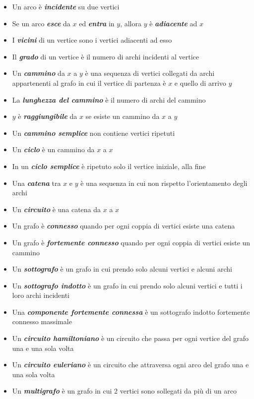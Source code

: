 \begin{itemize}
    \item Un arco è \textbf{\emph{incidente}} su due vertici
    \item Se un arco \textbf{\emph{esce}} da $x$ ed \textbf{\emph{entra}} in $y$, allora $y$ è \textbf{\emph{adiacente}} ad $x$
    \item I \textbf{\emph{vicini}} di un vertice sono i vertici adiacenti ad esso
    \item Il \textbf{\emph{grado}} di un vertice è il numero di archi incidenti al vertice
    \item Un \textbf{\emph{cammino}} da $x$ a $y$ è una sequenza di vertici collegati da archi appartenenti al grafo in cui il vertice di partenza è $x$ e quello di arrivo $y$
    \item La \textbf{\emph{lunghezza del cammino}} è il numero di archi del cammino
    \item $y$ è \textbf{\emph{raggiungibile}} da $x$ se esiste un cammino da $x$ a $y$
    \item Un \textbf{\emph{cammino semplice}} non contiene vertici ripetuti
    \item Un \textbf{\emph{ciclo}} è un cammino da $x$ a $x$
    \item In un \textbf{\emph{ciclo semplice}} è ripetuto solo il vertice iniziale, alla fine 
    \item Una \textbf{\emph{catena}} tra $x$ e $y$ è una sequenza in cui non rispetto l'orientamento degli archi
    \item Un \textbf{\emph{circuito}} è una catena da $x$ a $x$
    \item Un grafo è \textbf{\emph{connesso}} quando per ogni coppia di vertici esiste una catena
    \item Un grafo è \textbf{\emph{fortemente connesso}} quando per ogni coppia di vertici esiste un cammino
    \item Un \textbf{\emph{sottografo}} è un grafo in cui prendo solo alcuni vertici e alcuni archi 
    \item Un \textbf{\emph{sottografo indotto}} è un grafo in cui prendo solo alcuni vertici e tutti i loro archi incidenti
    \item Una \textbf{\emph{componente fortemente connessa}} è un sottografo indotto fortemente connesso massimale
    \item Un \textbf{\emph{circuito hamiltoniano}} è un circuito che passa per ogni vertice del grafo una e una sola volta
    \item Un \textbf{\emph{circuito euleriano}} è un circuito che attraversa ogni arco del grafo una e una sola volta
    \item Un \textbf{\emph{multigrafo}} è un grafo in cui 2 vertici sono sollegati da più di un arco 
\end{itemize}

